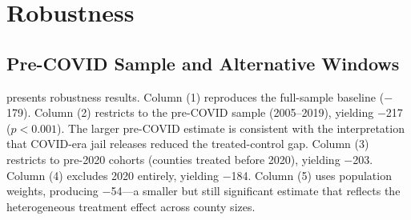 \documentclass[12pt]{article}
\begin{document}
\section{Robustness}

\subsection{Pre-COVID Sample and Alternative Windows}

 presents robustness results. Column (1) reproduces the full-sample baseline ($-$179). Column (2) restricts to the pre-COVID sample (2005--2019), yielding $-$217 ($p < 0.001$). The larger pre-COVID estimate is consistent with the interpretation that COVID-era jail releases reduced the treated-control gap. Column (3) restricts to pre-2020 cohorts (counties treated before 2020), yielding $-$203. Column (4) excludes 2020 entirely, yielding $-$184. Column (5) uses population weights, producing $-$54---a smaller but still significant estimate that reflects the heterogeneous treatment effect across county sizes.
\end{document}
